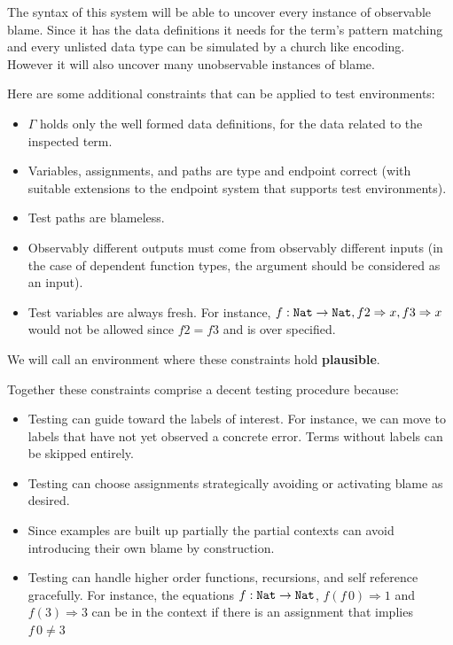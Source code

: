 The syntax of this system will be able to uncover every instance of observable blame.
Since it has the data definitions it needs for the term's pattern matching and every unlisted data type can be simulated by a church like encoding.
However it will also uncover many unobservable instances of blame.

Here are some additional constraints that can be applied to test environments:

\begin{itemize}
  \item $\Gamma$ holds only the well formed data definitions, for the data related to the inspected term.
  \item Variables, assignments, and paths are type and endpoint correct (with suitable extensions to the endpoint system that supports test environments).
  \item Test paths are blameless.
  \item Observably different outputs must come from observably different inputs (in the case of dependent function types, the argument should be considered as an input).
  \item Test variables are always fresh.
  For instance, $f:\mathtt{Nat}{}\rightarrow\mathtt{Nat}{},f2\Rightarrow x,f3\Rightarrow x$ would not be allowed since $f2=f3$ and is over specified.
\end{itemize}
We will call an environment where these constraints hold \textbf{plausible}.

Together these constraints comprise a decent testing procedure because:
\begin{itemize}
\item Testing can guide toward the labels of interest.
For instance, we can move to labels that have not yet observed a concrete error.
Terms without labels can be skipped entirely.
\item Testing can choose assignments strategically avoiding or activating blame as desired.
\item Since examples are built up partially the partial contexts can avoid introducing their own blame by construction.
\item Testing can handle higher order functions, recursions, and self reference gracefully.
For instance, the equations $f: \mathtt{Nat}{} \rightarrow \mathtt{Nat}{}$, $f\left(f\,0\right)\Rightarrow 1$ and $f\left(3\right)\Rightarrow 3$ can be in the context if there is an assignment that implies $f\,0\neq3$
\end{itemize}
  
